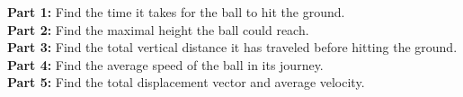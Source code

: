\documentclass[11pt]{article}
\begin{document}
\noindent\textbf{Part 1:} Find the time it takes for the ball to hit the ground. \\
\textbf{Part 2:} Find the maximal height the ball could reach. \\
\textbf{Part 3:} Find the total vertical distance it has traveled before hitting the ground.\\
\textbf{Part 4:} Find the average speed of the ball in its journey.\\
\textbf{Part 5:} Find the total displacement vector and average velocity.\\


\newpage

 
\end{document}
